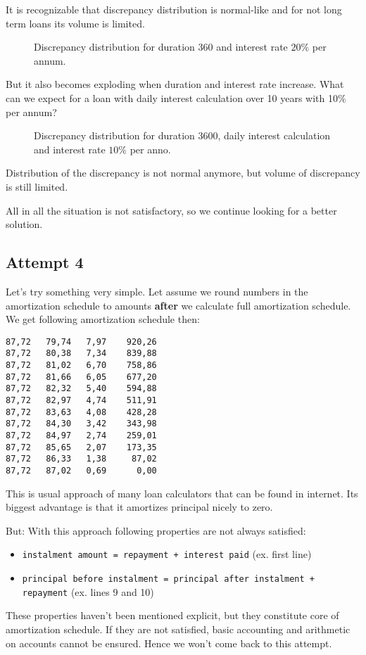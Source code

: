 \documentclass[letterpaper,11pt]{article}
\begin{document}
It is recognizable that discrepancy distribution is normal-like and for not long term loans its volume is limited.

\begin{center}
\begin{figure}[hp]
   \caption{Discrepancy distribution for duration 360 and interest rate $20\%$ per annum.}
\end{figure}
\end{center}

But it also becomes exploding when duration and interest rate increase. What can we expect for a loan with daily interest calculation over 10 years with 10\% per annum?

\begin{center}
\begin{figure}[hp]
   \caption{Discrepancy distribution for duration 3600, daily interest calculation and interest rate $10\%$ per anno.}
\end{figure}
\end{center}

Distribution of the discrepancy is not normal anymore, but volume of discrepancy is still limited.

All in all the situation is not satisfactory, so we continue looking for a better solution.

\subsection {Attempt 4}
Let's try something very simple.
Let assume we round numbers in the amortization schedule to amounts {\bf after} we calculate full amortization schedule. We get following amortization schedule then:
\begin{verbatim}
87,72   79,74   7,97    920,26
87,72   80,38   7,34    839,88
87,72   81,02   6,70    758,86
87,72   81,66   6,05    677,20
87,72   82,32   5,40    594,88
87,72   82,97   4,74    511,91
87,72   83,63   4,08    428,28
87,72   84,30   3,42    343,98
87,72   84,97   2,74    259,01
87,72   85,65   2,07    173,35
87,72   86,33   1,38     87,02
87,72   87,02   0,69      0,00
\end{verbatim}

This is usual approach of many loan calculators that can be found in internet. Its biggest advantage is that it amortizes principal nicely to zero.

But: With this approach following properties are not always satisfied:
\begin{itemize}
\item  {\tt instalment amount = repayment + interest paid} (ex. first line)
\item {\tt principal before instalment = principal after instalment + repayment} (ex. lines 9 and 10)
\end{itemize}
These properties haven't been mentioned explicit, but they constitute core of amortization schedule. If they are not satisfied, basic accounting and arithmetic on accounts cannot be ensured. Hence we won't come back to this attempt.
\end{document}
